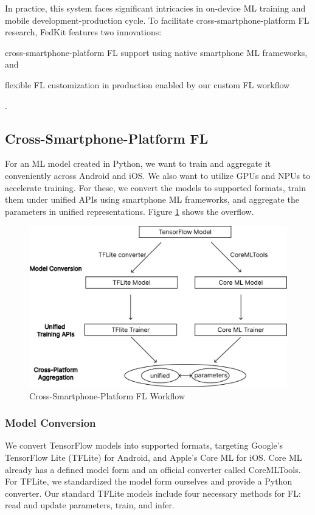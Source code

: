 \documentclass[letterpaper]{article} %
\begin{document}
In practice, this system faces significant intricacies in
on-device ML training and mobile development-production cycle.
To facilitate cross-smartphone-platform FL research,
FedKit features two innovations:
\begin{enumerate*}[label=\arabic*)]
    \item cross-smartphone-platform FL support using
          native smartphone ML frameworks, and
    \item flexible FL customization in production enabled by
          our custom FL workflow
\end{enumerate*}.

\subsection{Cross-Smartphone-Platform FL}

For an ML model created in Python,
we want to train and aggregate it conveniently across Android and iOS.
We also want to utilize GPUs and NPUs to accelerate training.
For these, we convert the models to supported formats,
train them under unified APIs using smartphone ML frameworks,
and aggregate the parameters in unified representations. Figure \ref*{cross_fl} shows the overflow.

\begin{figure}
    \centering
    \includegraphics*[width=\linewidth]{cross_smart_fl_workflow.pdf}
    \caption{Cross-Smartphone-Platform FL Workflow}
    \label{cross_fl}
\end{figure}

\subsubsection{Model Conversion}
We convert TensorFlow models into supported formats,
targeting Google's TensorFlow Lite (TFLite) for Android,
and Apple's Core ML for iOS.
Core ML already has a defined model form and an official converter called
CoreMLTools.
For TFLite, we standardized the model form ourselves and
provide a Python converter.
Our standard TFLite models include four necessary methods for FL:
read and update parameters, train, and infer.
\end{document}

